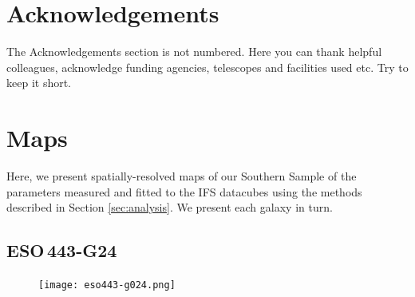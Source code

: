 \documentclass[a4paper,fleqn,usenatbib]{mnras}
\begin{document}


\section*{Acknowledgements}

The Acknowledgements section is not numbered. Here you can thank helpful
colleagues, acknowledge funding agencies, telescopes and facilities used etc.
Try to keep it short.









\appendix
\section{Maps}
	\label{sec:Maps}

	Here, we present spatially-resolved maps of our Southern Sample of the parameters measured and fitted to the IFS datacubes using the methods described in Section \ref{sec:analysis}. We present each galaxy in turn.

	\subsection{ESO\,443-G24}
		\begin{figure}
			\centering
			\texttt{[image: eso443-g024.png]}
			\caption{}
			\label{fig:eso443}
		\end{figure}
\end{document}
